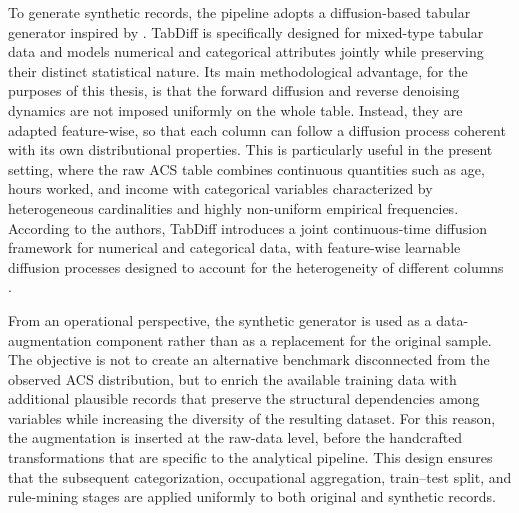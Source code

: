 To generate synthetic records, the pipeline adopts a diffusion-based tabular generator inspired by \textcite{shi2025tabdiff}. TabDiff is specifically designed for mixed-type tabular data and models numerical and categorical attributes jointly while preserving their distinct statistical nature. Its main methodological advantage, for the purposes of this thesis, is that the forward diffusion and reverse denoising dynamics are not imposed uniformly on the whole table. Instead, they are adapted feature-wise, so that each column can follow a diffusion process coherent with its own distributional properties. This is particularly useful in the present setting, where the raw ACS table combines continuous quantities such as age, hours worked, and income with categorical variables characterized by heterogeneous cardinalities and highly non-uniform empirical frequencies. According to the authors, TabDiff introduces a joint continuous-time diffusion framework for numerical and categorical data, with feature-wise learnable diffusion processes designed to account for the heterogeneity of different columns \cite{shi2025tabdiff}.

From an operational perspective, the synthetic generator is used as a data-augmentation component rather than as a replacement for the original sample. The objective is not to create an alternative benchmark disconnected from the observed ACS distribution, but to enrich the available training data with additional plausible records that preserve the structural dependencies among variables while increasing the diversity of the resulting dataset. For this reason, the augmentation is inserted at the raw-data level, before the handcrafted transformations that are specific to the analytical pipeline. This design ensures that the subsequent categorization, occupational aggregation, train--test split, and rule-mining stages are applied uniformly to both original and synthetic records.

